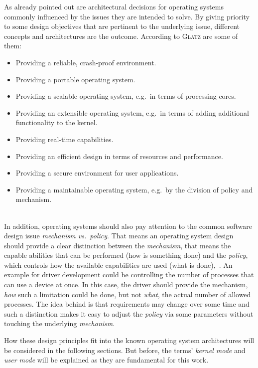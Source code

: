 As already pointed out are architectural decisions for operating systems commonly influenced by the issues they are intended to solve.
By giving priority to some design objectives that are pertinent to the underlying issue, different concepts and architectures are the outcome.
According to \textsc{Glatz}\cite{glatz2015betriebssysteme} are some of them:
\begin{itemize}
    \item Providing a reliable, crash-proof environment.
    \item Providing a portable operating system.
    \item Providing a scalable operating system, e.g.\ in terms of processing cores.
    \item Providing an extensible operating system, e.g.\ in terms of adding additional functionality to the kernel.
    \item Providing real-time capabilities.
    \item Providing an efficient design in terms of resources and performance.
    \item Providing a secure environment for user applications.
    \item Providing a maintainable operating system, e.g.\ by the division of policy and mechanism. 
\end{itemize}\ \\
%
In addition, operating systems should also pay attention to the common software design issue \textit{mechanism vs.\ policy}.
That means an operating system design should provide a clear distinction between the \textit{mechanism}, that means the capable abilities that can be performed (how is something done) and the \textit{policy}, which controls how the available capabilities are used (what is done)\cite{lfd430},~\cite{silberschatz2009operating}.
An example for driver development could be controlling the number of processes that can use a device at once.
In this case, the driver should provide the mechanism, \textit{how} such a limitation could be done, but not \textit{what}, the actual number of allowed processes. 
The idea behind is that requirements may change over some time and such a distinction makes it easy to adjust the \textit{policy} via some parameters without touching the underlying \textit{mechanism}\cite{silberschatz2009operating}.

How these design principles fit into the known operating system architectures will be considered in the following sections.
But before, the terms' \textit{kernel mode} and \textit{user mode} will be explained as they are fundamental for this work.

